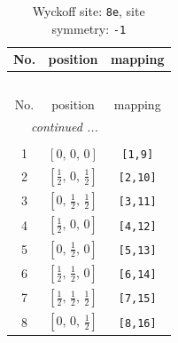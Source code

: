 \documentclass[fleqn,8pt]{jsarticle}
\begin{document}
\renewcommand{\arraystretch}{1.2}
\begin{longtable}{ccc}
\caption{Wyckoff site: {\tt 8e}, site symmetry: {\tt -1}}
 \\
 \hline \hline
No. & position & mapping \\ \hline \endfirsthead

\multicolumn{2}{l}{\tablename\ \thetable{}} \\
 \hline \hline
No. & position & mapping \\ \hline \endhead

 \hline \hline
\multicolumn{2}{r}{\footnotesize\it continued ...} \\ \endfoot

 \hline \hline
\multicolumn{2}{r}{} \\ \endlastfoot

1 & $\left[ 0,\, 0,\, 0 \right]$ & {\tt [1,9]} \\ \hline
2 & $\left[ \frac{1}{2},\, 0,\, \frac{1}{2} \right]$ & {\tt [2,10]} \\ \hline
3 & $\left[ 0,\, \frac{1}{2},\, \frac{1}{2} \right]$ & {\tt [3,11]} \\ \hline
4 & $\left[ \frac{1}{2},\, 0,\, 0 \right]$ & {\tt [4,12]} \\ \hline
5 & $\left[ 0,\, \frac{1}{2},\, 0 \right]$ & {\tt [5,13]} \\ \hline
6 & $\left[ \frac{1}{2},\, \frac{1}{2},\, 0 \right]$ & {\tt [6,14]} \\ \hline
7 & $\left[ \frac{1}{2},\, \frac{1}{2},\, \frac{1}{2} \right]$ & {\tt [7,15]} \\ \hline
8 & $\left[ 0,\, 0,\, \frac{1}{2} \right]$ & {\tt [8,16]} \\
\end{longtable}
\renewcommand{\arraystretch}{1.2}
\end{document}
